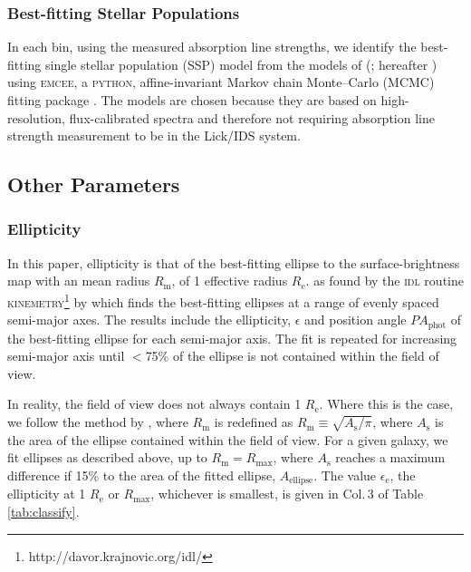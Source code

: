 \documentclass[a4paper,fleqn,usenatbib]{mnras}
\begin{document}
	\subsubsection{Best-fitting Stellar Populations}
		\label{subsubsec:stellarPop}
		In each bin, using the measured absorption line strengths, we identify the best-fitting single stellar population (SSP) model from the models of \citeauthor{Thomas2010} (\citeyear{Thomas2010}; hereafter ) using \textsc{emcee}, a \textsc{python}, affine-invariant Markov chain Monte--Carlo (MCMC) fitting package \citep{Foreman-Mackey2013}. The  models are chosen because they are based on high-resolution, flux-calibrated spectra and therefore not requiring absorption line strength measurement to be in the Lick/IDS system.

	\subsection{Other Parameters}
		\subsubsection{Ellipticity}
			\label{subsubsec:ellip}
			In this paper, ellipticity is that of the best-fitting ellipse to the surface-brightness map with an mean radius $R_\text{m}$, of 1 effective radius $R_\text{e}$. %
			as found by the \textsc{idl} routine \textsc{kinemetry}\footnote{http://davor.krajnovic.org/idl/} by \citet{Krajnovic2006} which finds the best-fitting ellipses at a range of evenly spaced semi-major axes. %
			The results include the ellipticity, $\epsilon$ and position angle $PA_\text{phot}$ of the best-fitting ellipse for each semi-major axis. The fit is repeated for increasing semi-major axis until $<$75\% of the ellipse is not contained within the field of view.

			In reality, the field of view does not always contain 1 $R_\text{e}$. Where this is the case, we follow the method by \citet{Emsellem2007}, where $R_\text{m}$ is redefined as $R_\text{m} \equiv \sqrt{A_\text{s}/\pi}$, where $A_\text{s}$ is the area of the ellipse contained within the field of view. For a given galaxy, we fit ellipses as described above, up to $R_\text{m} = R_\text{max}$, where $A_\text{s}$ reaches a maximum difference if 15\% to the area of the fitted ellipse, $A_\text{ellipse}$. The value $\epsilon_\text{e}$, the ellipticity at 1 $R_\text{e}$ or $R_\text{max}$, whichever is smallest, is given in Col.\,3 of Table \ref{tab:classify}. 
\end{document}
